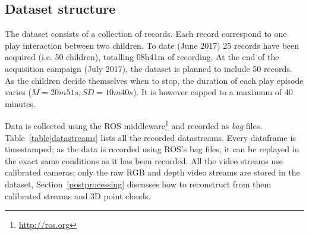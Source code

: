 \documentclass{article}
\newcommand{\ie}{i.e.\xspace}
\begin{document}
%
%
%
%
%



\subsection{Dataset structure}

The dataset consists of a collection of records. Each record correspond to one
play interaction between two children. To date (June 2017) 25 records have been
acquired (\ie 50 children), totalling 08h41m of recording. At the end of the acquisition campaign
(July 2017), the dataset is planned to include 50 records. As
the children decide themselves when to stop, the duration of each play episode varies ($M=20m51s,
SD=10m40s$). It is however capped to a maximum of 40 minutes.

Data is collected using the ROS middleware\footnote{\url{http://ros.org}} and
recorded as \emph{bag} files. Table~\ref{table|datastreams} lists all the
recorded datastreams.  Every dataframe is timestamped; as the data is recorded
using ROS's bag files, it can be replayed in the exact same conditions as it
has been recorded.  All the video streams use calibrated cameras; only the raw
RGB and depth video streams are stored in the dataset, Section~\ref{postprocessing} discusses
how to reconstruct from them calibrated streams and 3D point clouds.
\end{document}
